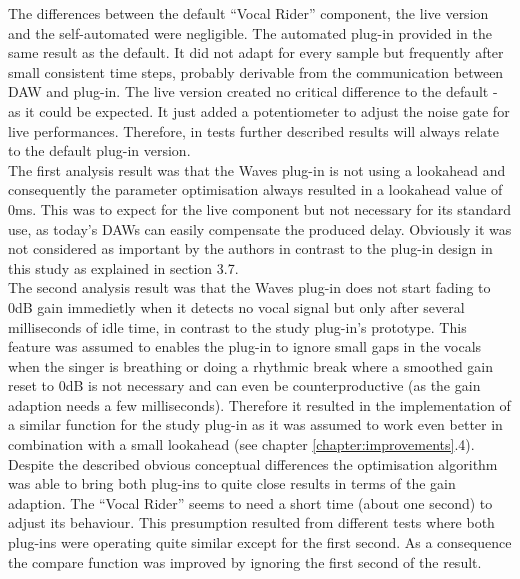 The differences between the default “Vocal Rider” component, the live version and the self-automated were negligible. The automated plug-in provided in the same result as the default. It did not adapt for every sample but frequently after small consistent time steps, probably derivable from the communication between DAW and plug-in. The live version created no critical difference to the default - as it could be expected. It just added a potentiometer to adjust the noise gate for live performances. Therefore, in tests further described results will always relate to the default plug-in version.\\
The first analysis result was that the Waves plug-in is not using a lookahead and consequently the parameter optimisation always resulted in a lookahead value of 0ms. This was to expect for the live component but not necessary for its standard use, as today's DAWs can easily compensate the produced delay. Obviously it was not considered as important by the authors in contrast to the plug-in design in this study as explained in section 3.7.\\
The second analysis result was that the Waves plug-in does not start fading to 0dB gain immedietly when it detects no vocal signal but only after several milliseconds of idle time, in contrast to the study plug-in's prototype. This feature was assumed to enables the plug-in to ignore small gaps in the vocals when the singer is breathing or doing a rhythmic break where a smoothed gain reset to 0dB is not necessary and can even be counterproductive (as the gain adaption needs a few milliseconds). Therefore it resulted in the implementation of a similar function for the study plug-in as it was assumed to work even better in combination with a small lookahead (see chapter \ref{chapter:improvements}.4).\\
Despite the described obvious conceptual differences the optimisation algorithm was able to bring both plug-ins to quite close results in terms of the gain adaption. The “Vocal Rider” seems to need a short time (about one second) to adjust its behaviour. This presumption resulted from different tests where both plug-ins were operating quite similar except for the first second. As a consequence the compare function was improved by ignoring the first second of the result.\\
